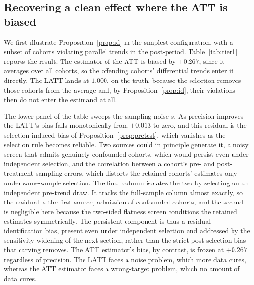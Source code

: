\documentclass[12pt]{article}
\theoremstyle{remark}
\begin{document}
\subsection{Recovering a clean effect where the ATT is biased}

We first illustrate Proposition~\ref{prop:id} in the simplest configuration, with a subset of cohorts
violating parallel trends in the post-period. Table~\ref{tab:tier1} reports the result. The estimator
of the ATT is biased by $+0.267$, since it averages over all cohorts, so the offending cohorts'
differential trends enter it directly. The LATT lands at $1.000$, on the truth, because the selection
removes those cohorts from the average and, by Proposition~\ref{prop:id}, their violations then do not
enter the estimand at all.

The lower panel of the table sweeps the sampling noise $s$.
As precision improves the LATT's bias falls monotonically from $+0.013$ to zero, and this residual is the
selection-induced bias of Proposition~\ref{prop:pretest}, which vanishes as the selection rule becomes reliable.
Two sources could in principle generate it, a noisy screen that admits genuinely confounded cohorts, which
would persist even under independent selection, and the correlation between a cohort's pre- and
post-treatment sampling errors, which distorts the retained cohorts' estimates only under same-sample
selection. The final column isolates the two by selecting on an independent pre-trend draw. It tracks the
full-sample column almost exactly, so the residual is the first source, admission of confounded cohorts,
and the second is negligible here because the two-sided flatness screen conditions the retained estimates
symmetrically. The persistent component is thus a residual identification bias, present even under
independent selection and addressed by the sensitivity widening of the next section, rather than the strict
post-selection bias that carving removes. The ATT estimator's bias, by contrast, is frozen at $+0.267$ regardless of precision. The
LATT faces a noise problem, which more data cures, whereas the ATT estimator faces a wrong-target problem,
which no amount of data cures.
\end{document}

